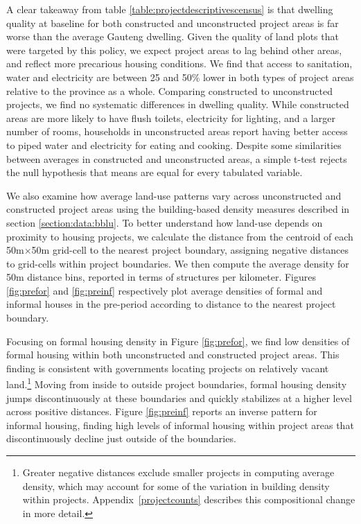 \documentclass[12pt]{article}
\begin{document}
A clear takeaway from table \ref{table:projectdescriptivescensus} is that dwelling quality at baseline for both constructed and unconstructed project areas is far worse than the average Gauteng dwel\-ling. Given the quality of land plots that were targeted by this policy, we expect project areas to lag behind other areas, and reflect more precarious housing conditions. We find that access to sanitation, water and electricity are between 25 and 50\% lower in both types of project areas relative to the province as a whole. Comparing constructed to unconstructed projects, we find no systematic differences in dwelling quality. While constructed areas are more likely to have flush toilets, electricity for lighting, and a larger number of rooms, households in unconstructed areas report having better access to piped water and electricity for eating and cooking. Despite some similarities between averages in constructed and unconstructed areas, a simple t-test rejects the null hypothesis that means are equal for every tabulated variable.

We also examine how average land-use patterns vary across unconstructed and constructed project areas using the building-based density measures described in section \ref{section:data:bblu}.  To better understand how land-use depends on proximity to housing projects, we calculate the distance from the centroid of each 50m$\times$50m grid-cell to the nearest project boundary, assigning negative distances to grid-cells within project boundaries.  We then compute the average density for 50m distance bins, reported in terms of structures per kilometer.  Figures \ref{fig:prefor} and \ref{fig:preinf} respectively plot average densities of formal and informal houses in the pre-period according to distance to the nearest project boundary.

Focusing on formal housing density in Figure \ref{fig:prefor}, we find low densities of formal housing within both unconstructed and constructed project areas. This finding is consistent with governments locating projects on relatively vacant land.\footnote{Greater negative distances exclude smaller projects in computing average density, which may account for some of the variation in building density within projects.  Appendix~\ref{projectcounts} describes this compositional change in more detail.}  Moving from inside to outside project boundaries, formal housing density jumps discontinuously at these boundaries and quickly stabilizes at a higher level across positive distances.  Figure \ref{fig:preinf} reports an inverse pattern for informal housing, finding high levels of informal housing within project areas that discontinuously decline just outside of the boundaries.  
\end{document}
